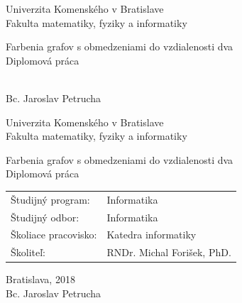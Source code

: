 \documentclass[12pt, oneside]{book}
\def\mfrok{2018}
\def\mfnazov{Farbenia grafov s obmedzeniami do vzdialenosti dva}
\def\mftyp{Diplomová práca}
\def\mfautor{Bc. Jaroslav Petrucha}
\def\mfskolitel{RNDr. Michal Forišek, PhD.}
\def\mfkonzultant{tit. Meno Priezvisko, tit. }
\def\mfmiesto{Bratislava, \mfrok}
\def\mfodbor{Informatika}
\def\program{ Informatika }
\def\mfpracovisko{ Katedra informatiky }
\begin{document}
     
\frontmatter


\thispagestyle{empty}

\begin{center}
\sc\large
Univerzita Komenského v Bratislave\\
Fakulta matematiky, fyziky a informatiky

\vfill

{\LARGE\mfnazov}\\
\mftyp
\end{center}

\vfill

{\sc\large 
\noindent \mfrok\\
\mfautor
}

\eject %


\thispagestyle{empty}
\noindent

\begin{center}
\sc  
\large
Univerzita Komenského v Bratislave\\
Fakulta matematiky, fyziky a informatiky

\vfill

{\LARGE\mfnazov}\\
\mftyp
\end{center}

\vfill

\noindent
\begin{tabular}{ll}
Študijný program: & \program \\
Študijný odbor: & \mfodbor \\
Školiace pracovisko: & \mfpracovisko \\
Školiteľ: & \mfskolitel \\
\end{tabular}

\vfill


\noindent \mfmiesto\\
\mfautor

\eject %




\end{document}
